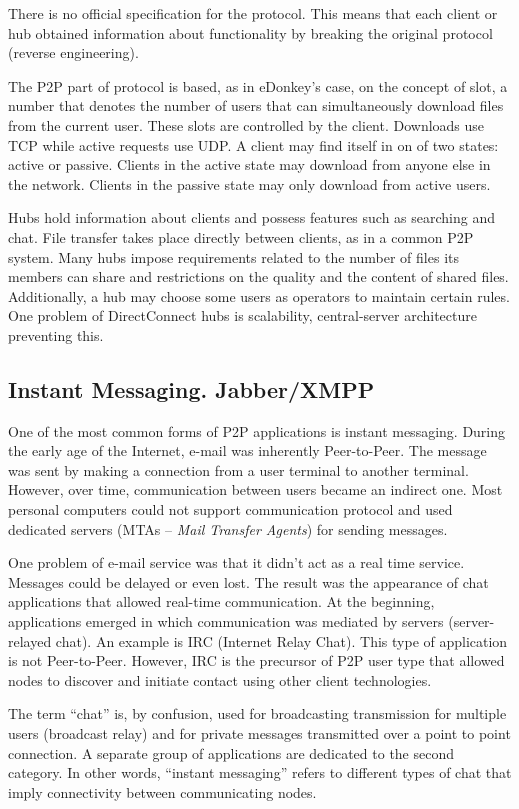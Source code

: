 There is no official specification for the protocol. This means that each
client or hub obtained information about functionality by breaking the
original protocol (reverse engineering).

The P2P part of protocol is based, as in eDonkey's case, on the concept of
slot, a number that denotes the number of users that can simultaneously
download files from the current user. These slots are controlled by the
client. Downloads use TCP while active requests use UDP. A client may find
itself in on of two states: active or passive. Clients in the active state may
download from anyone else in the network. Clients in the passive state may
only download from active users.

Hubs hold information about clients and possess features such as searching and
chat. File transfer takes place directly between clients, as in a common P2P
system. Many hubs impose requirements related to the number of files its
members can share and restrictions on the quality and the content of shared
files. Additionally, a hub may choose some users as operators to maintain
certain rules. One problem of DirectConnect hubs is scalability,
central-server architecture preventing this.

\subsection{Instant Messaging. Jabber/XMPP}

One of the most common forms of P2P applications is instant messaging. During
the early age of the Internet, e-mail was inherently Peer-to-Peer. The message
was sent by making a connection from a user terminal to another terminal.
However, over time, communication between users became an indirect one. Most
personal computers could not support communication protocol and used dedicated
servers (MTAs -- \textit{Mail Transfer Agents}) for sending messages.

One problem of e-mail service was that it didn't act as a real time service.
Messages could be delayed or even lost. The result was the appearance of
chat applications that allowed real-time communication. At the beginning,
applications emerged in which communication was mediated by servers
(server-relayed chat). An example is IRC (Internet Relay Chat). This type of
application is not Peer-to-Peer. However, IRC is the precursor of P2P user type
that allowed nodes to discover and initiate contact using other client
technologies.

The term ``chat'' is, by confusion, used for broadcasting transmission for
multiple users (broadcast relay) and for private messages transmitted over a
point to point connection. A separate group of applications are dedicated to
the second category. In other words, ``instant messaging'' refers to different
types of chat that imply connectivity between communicating nodes.

